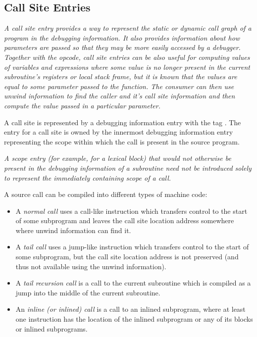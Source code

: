 \subsection{Call Site Entries}
\label{chap:callsiteentries}
\textit{
A call site entry provides a way to represent the static or dynamic 
call graph of a program in the debugging information. It also provides
information about how parameters are passed so that they may be more
easily accessed by a debugger. Together with the \DWOPentryvalue{} opcode,
call site entries can be also useful for computing values of variables 
and expressions where some value is no longer present in the current 
subroutine's registers or local stack frame, but it is known that the 
values are equal to some parameter passed to the function.  
The consumer can then use unwind
information to find the caller and it's call site information and then
compute the value passed in a particular parameter.}

A call site is represented by a debugging information entry with the tag
\DWTAGcallsiteTARG{}.  The entry for a call site is owned by the innermost
debugging information entry representing the scope within which the
call is present in the source program.

\textit{A scope entry (for example, for a lexical block) that would not 
otherwise be present in the debugging information of a subroutine
need not be introduced solely to represent the immediately containing scope
of a call.}

A source call can be compiled into different types of machine code:
\begin{itemize}
\item
A \textit{normal call} uses a call-like instruction which transfers 
control to the start of some subprogram and leaves the call site 
location address somewhere where unwind information can find it.  
\item
A \textit{tail call} uses a jump-like instruction which
transfers control to the start of some subprogram, but the call site location
address is not preserved (and thus not available using the unwind information).  
\item
A \textit{tail recursion call} is a call
to the current subroutine which is compiled as a jump into the middle of the
current subroutine.
\item
An \textit{inline (or inlined) call} is a call to an inlined subprogram,
where at least one instruction has the location of the inlined subprogram
or any of its blocks or inlined subprograms. 
\end{itemize}

